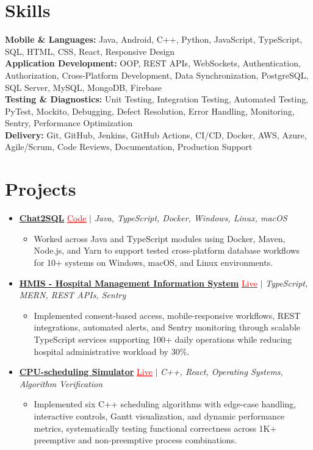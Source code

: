 \documentclass[letterpaper,10pt]{article}
\newcommand{\itemTail}{\vspace{-4pt}}
\newcommand{\sectionGap}{\vspace{-8pt}}
\newcommand{\projGap}{\vspace{3pt}}
\newcommand{\resumeItem}[1]{\item\small{{#1 \itemTail}}}
\newcommand{\resumeProjectHeading}[1]{\item \small #1 \vspace{-2pt}}
\newcommand{\resumeProjectLink}[2]{\href{#1}{\textcolor{red}{\underline{#2}}}}
\newcommand{\resumeSubHeadingListStart}{\begin{itemize}[leftmargin=0.0in, label={}]}
\newcommand{\resumeSubHeadingListEnd}{\end{itemize}}
\newcommand{\resumeProjItemListStart}{\begin{itemize}[leftmargin=0.15in,label=\textbullet,itemsep=3pt,topsep=0pt,parsep=0pt,partopsep=0pt]}
\newcommand{\resumeProjItemListEnd}{\end{itemize}\vspace{-4pt}}
\begin{document}
\section{Skills}
\begin{itemize}[leftmargin=0.15in, label={}]
\small{\item{
\textbf{Mobile \& Languages:} Java, Android, C++, Python, JavaScript, TypeScript, SQL, HTML, CSS, React, Responsive Design \\
\textbf{Application Development:} OOP, REST APIs, WebSockets, Authentication, Authorization, Cross-Platform Development, Data Synchronization, PostgreSQL, SQL Server, MySQL, MongoDB, Firebase \\
\textbf{Testing \& Diagnostics:} Unit Testing, Integration Testing, Automated Testing, PyTest, Mockito, Debugging, Defect Resolution, Error Handling, Monitoring, Sentry, Performance Optimization \\
\textbf{Delivery:} Git, GitHub, Jenkins, GitHub Actions, CI/CD, Docker, AWS, Azure, Agile/Scrum, Code Reviews, Documentation, Production Support
}}
\end{itemize}
\sectionGap
\section{Projects}
\resumeSubHeadingListStart
\vspace{-2pt}
\resumeProjectHeading{\href{https://github.com/SAHAJ-BHADJA/Chat2SQL}{\textbf{Chat2SQL}} \resumeProjectLink{https://github.com/SAHAJ-BHADJA/Chat2SQL}{Code} $|$ \emph{Java, TypeScript, Docker, Windows, Linux, macOS}}
\resumeProjItemListStart
\resumeItem{Worked across Java and TypeScript modules using Docker, Maven, Node.js, and Yarn to support tested cross-platform database workflows for 10+ systems on Windows, macOS, and Linux environments.}
\resumeProjItemListEnd
\projGap
\resumeProjectHeading{\href{https://hims-rouge.vercel.app/}{\textbf{HMIS - Hospital Management Information System}} \resumeProjectLink{https://hims-rouge.vercel.app/}{Live} $|$ \emph{TypeScript, MERN, REST APIs, Sentry}}
\resumeProjItemListStart
\resumeItem{Implemented consent-based access, mobile-responsive workflows, REST integrations, automated alerts, and Sentry monitoring through scalable TypeScript services supporting 100+ daily operations while reducing hospital administrative workload by 30\%.}
\resumeProjItemListEnd
\projGap
\resumeProjectHeading{\href{https://cpu-scheduler-amber.vercel.app/}{\textbf{CPU-scheduling Simulator}} \resumeProjectLink{https://cpu-scheduler-amber.vercel.app/}{Live} $|$ \emph{C++, React, Operating Systems, Algorithm Verification}}
\resumeProjItemListStart
\resumeItem{Implemented six C++ scheduling algorithms with edge-case handling, interactive controls, Gantt visualization, and dynamic performance metrics, systematically testing functional correctness across 1K+ preemptive and non-preemptive process combinations.}
\resumeProjItemListEnd
\resumeSubHeadingListEnd
\end{document}
